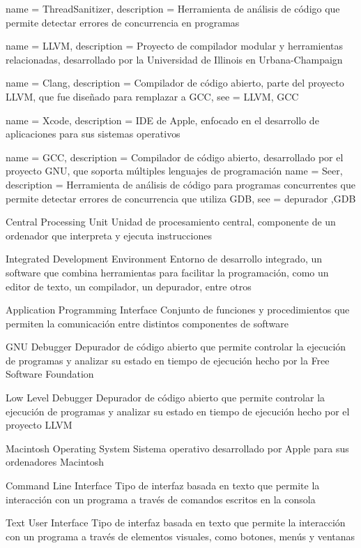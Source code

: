  {
    name = {ThreadSanitizer},
    description = {Herramienta de análisis de código que permite detectar errores de concurrencia en programas}
}

 {
    name = {LLVM},
    description = {Proyecto de compilador modular y herramientas relacionadas, desarrollado por la Universidad de Illinois en Urbana-Champaign}
}

 {
    name = {Clang},
    description = {Compilador de código abierto, parte del proyecto LLVM, que fue diseñado para remplazar a GCC},
    see = {LLVM, GCC}
}

 {
    name = {Xcode},
    description = {IDE de Apple, enfocado en el desarrollo de aplicaciones para sus sistemas operativos}
}

 {
    name = {GCC},
    description = {Compilador de código abierto, desarrollado por el proyecto GNU, que soporta múltiples lenguajes de programación}
}
 {
    name = {Seer},
    description = {Herramienta de análisis de código para programas concurrentes que permite detectar errores de concurrencia que utiliza GDB},
    see = {depurador ,GDB}
}

{Central Processing Unit}
{Unidad de procesamiento central, componente de un ordenador que interpreta y ejecuta instrucciones}


{Integrated Development Environment}
{Entorno de desarrollo integrado, un software que combina herramientas para facilitar la programación, como un editor de texto, un compilador, un depurador, entre otros}

{Application Programming Interface}
{Conjunto de funciones y procedimientos que permiten la comunicación entre distintos componentes de software}

{GNU Debugger}
{Depurador de código abierto que permite controlar la ejecución
de programas y analizar su estado en tiempo de ejecución hecho por la Free Software Foundation}

{Low Level Debugger}
{Depurador de código abierto que permite controlar la ejecución
de programas y analizar su estado en tiempo de ejecución hecho por el proyecto LLVM}

{Macintosh Operating System}
{Sistema operativo desarrollado por Apple para sus ordenadores Macintosh}

{Command Line Interface}
{Tipo de interfaz basada en texto que permite la interacción con un programa a través de comandos escritos en la consola}

{Text User Interface}
{Tipo de interfaz basada en texto que permite la interacción con un programa a través de elementos visuales, como botones, menús y ventanas}

